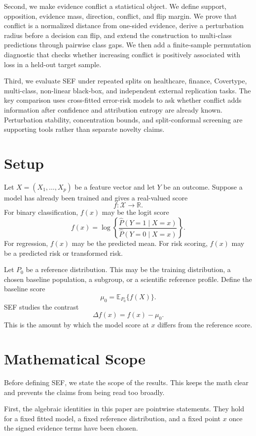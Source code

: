 \documentclass[11pt]{article}
\newcommand{\E}{\mathbb{E}}
\newcommand{\R}{\mathbb{R}}
\begin{document}
Second, we make evidence conflict a statistical object. We define support, opposition, evidence mass, direction, conflict, and flip margin. We prove that conflict is a normalized distance from one-sided evidence, derive a perturbation radius before a decision can flip, and extend the construction to multi-class predictions through pairwise class gaps. We then add a finite-sample permutation diagnostic that checks whether increasing conflict is positively associated with loss in a held-out target sample.

Third, we evaluate SEF under repeated splits on healthcare, finance, Covertype, multi-class, non-linear black-box, and independent external replication tasks. The key comparison uses cross-fitted error-risk models to ask whether conflict adds information after confidence and attribution entropy are already known. Perturbation stability, concentration bounds, and split-conformal screening are supporting tools rather than separate novelty claims.

\section{Setup}

Let $X=(X_1,\ldots,X_p)$ be a feature vector and let $Y$ be an outcome. Suppose a model has already been trained and gives a real-valued score
\[
f:\mathcal{X}\rightarrow \R.
\]
For binary classification, $f(x)$ may be the logit score
\[
f(x)=\log\left\{\frac{\widehat{P}(Y=1\mid X=x)}
{\widehat{P}(Y=0\mid X=x)}\right\}.
\]
For regression, $f(x)$ may be the predicted mean. For risk scoring, $f(x)$ may be a predicted risk or transformed risk.

Let $P_0$ be a reference distribution. This may be the training distribution, a chosen baseline population, a subgroup, or a scientific reference profile. Define the baseline score
\[
\mu_0=\E_{P_0}\{f(X)\}.
\]
SEF studies the contrast
\[
\Delta f(x)=f(x)-\mu_0.
\]
This is the amount by which the model score at $x$ differs from the reference score.

\section{Mathematical Scope}

Before defining SEF, we state the scope of the results. This keeps the math clear and prevents the claims from being read too broadly.

First, the algebraic identities in this paper are pointwise statements. They hold for a fixed fitted model, a fixed reference distribution, and a fixed point $x$ once the signed evidence terms have been chosen.
\end{document}
